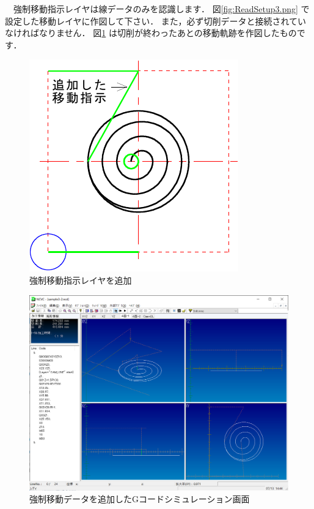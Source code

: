 \begin{minipage}[t]{0.5\textwidth}
　強制移動指示レイヤは線データのみを認識します．
図\ref{fig:ReadSetup3.png} で設定した移動レイヤに作図して下さい．
また，必ず切削データと接続されていなければなりません．
図\ref{fig:move.pdf} は切削が終わったあとの移動軌跡を作図したものです．
\end{minipage}
\begin{minipage}[t]{0.5\textwidth}
\vspace*{-2zh}
\begin{figure}[H]
\centering
\includegraphics{No3/fig/move-crop.pdf}
\caption{強制移動指示レイヤを追加}
\label{fig:move.pdf}
\end{figure}
\end{minipage}

\begin{figure}[H]
\centering
\includegraphics[scale=0.55]{No3/fig/sample3-2.png}
\caption{強制移動データを追加したGコードシミュレーション画面}
\label{fig:sample3-2.png}
\end{figure}

